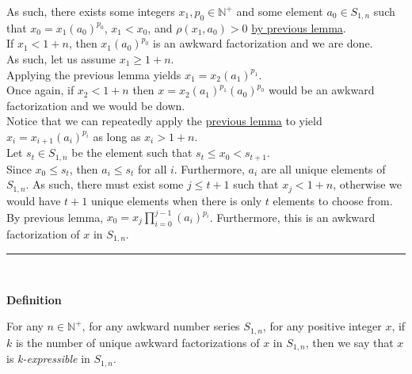 \documentclass[a4paper,12pt]{article}
\begin{document}
\noindent As such, there exists some integers $x_1, p_0 \in \mathbb{N}^+$ and some element $a_0 \in S_{1, n}$ such that $x_0 = x_1(a_0)^{p_0}$, $x_1 < x_0$, and $\rho(x_1, a_0) > 0$ \hyperlink{lemma:non_common_factorization}{by previous lemma}.\\

\noindent If $x_1 < 1 + n$, then $x_1(a_0)^{p_0}$ is an awkward factorization and we are done.\\

\noindent As such, let us assume $x_1 \geq 1 + n$.\\

\noindent Applying the previous lemma yields $x_1 = x_2(a_1)^{p_1}$.\\

\noindent Once again, if $x_2 < 1 + n$ then $x = x_2(a_1)^{p_1}(a_0)^{p_0}$ would be an awkward factorization and we would be down.\\

\noindent Notice that we can repeatedly apply the \hyperlink{lemma:non_common_factorization}{previous lemma} to yield\\ $x_i = x_{i + 1}(a_i)^{p_i}$ as long as $x_i > 1 + n$.\\

\noindent Let $s_t \in S_{1, n}$ be the element such that $s_t \leq x_0 < s_{t + 1}$.\\

\noindent Since $x_0 \leq s_t$, then $a_i \leq s_t$ for all $i$. Furthermore, $a_i$ are all unique elements of $S_{1, n}$. As such, there must exist some $j \leq t + 1$ such that $x_j < 1 + n$, otherwise we would have $t + 1$ unique elements when there is only $t$ elements to choose from.\\

\noindent By previous lemma, $\displaystyle x_0 = x_j \prod_{i = 0}^{j - 1}(a_i)^{p_i}$. Furthermore, this is an awkward factorization of $x$ in $S_{1, n}$.

\begin{center}
\noindent\rule{8cm}{0.4pt}
\end{center}
\noindent \\







\label{definition:expressability}
\hypertarget{definition:expressability}{}
\begin{tcolorbox}
\textbf{Definition}

For any $n \in \mathbb{N}^+$, for any awkward number series $S_{1,n}$, for any positive integer $x$, if $k$ is the number of unique awkward factorizations of $x$ in $S_{1, n}$, then we say that $x$ is \textit{k-expressible} in $S_{1, n}$.

\end{tcolorbox}
\end{document}
